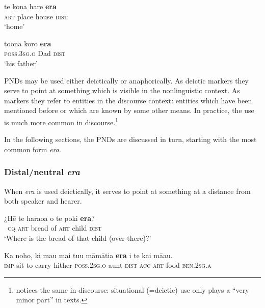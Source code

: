\ea\label{ex:4.195}
\gll te kona hare \textbf{era} \\
\textsc{art} place house \textsc{dist} \\

\glt 
‘home’ \textstyleExampleref{[R210.021]} 
\z

\ea\label{ex:4.196}
\gll tō{\ꞌ}ona koro \textbf{era} \\
\textsc{poss.3sg.o} Dad \textsc{dist} \\

\glt
‘his father’ \textstyleExampleref{[R380.010]} 
\z

PNDs may be used either deictically or anaphorically. As deictic markers they serve to point at something which is visible in the nonlinguistic context. As  markers they refer to entities in the discourse context: entities which have been mentioned before or which are known by some other means. In practice, the  use is much more common in discourse.\footnote{\label{fn:216}\citet[363]{Hooper2010} notices the same in  discourse: situational (=deictic) use only plays a “very minor part” in texts.}

In the following sections, the PNDs are discussed in turn, starting with the most common form \textit{era}.

\subsubsection[Distal/neutral era]{Distal/neutral \textit{era}}\label{sec:4.6.3.1}

When \textit{era} is used deictically, it serves to point at something at a distance from both speaker and hearer. 

\ea\label{ex:4.197}
\gll ¿Hē te haraoa o te poki \textbf{era}?\\
~\textsc{cq} \textsc{art} bread of \textsc{art} child \textsc{dist}\\

\glt 
‘Where is the bread of that child (over there)?’ \textstyleExampleref{[R245.041]} 
\z

\ea\label{ex:4.198}
\gll Ka noho, ki ma{\ꞌ}u mai tu{\ꞌ}u māmātia \textbf{era} i te kai mā{\ꞌ}au.\\
\textsc{imp} sit to carry hither \textsc{poss.2sg.o} aunt \textsc{dist} \textsc{acc} \textsc{art} food \textsc{ben.2sg.a}\\

